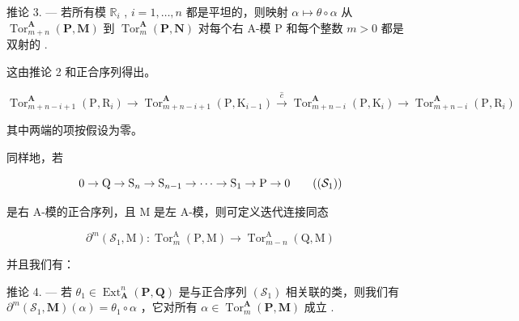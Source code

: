 推论 3. --- 若所有模 \(\mathbb{R}_i\) , \(i = 1, \ldots, n\) 都是平坦的，则映射 \(\alpha \mapsto \theta \circ \alpha\) 从 \(\operatorname{Tor}_{m+n}^{\mathbf{A}}(\mathbf{P}, \mathbf{M})\) 到 \(\operatorname{Tor}_m^{\mathbf{A}}(\mathbf{P}, \mathbf{N})\) 对每个右 A-模 P 和每个整数 \(m > 0\) 都是双射的 .

这由推论 2 和正合序列得出。

\[
\operatorname{Tor} _ {m + n - i + 1} ^ {\mathbf {A}} \left(\mathrm{P}, \mathrm{R} _ {i}\right)\rightarrow \operatorname{Tor} _ {m + n - i + 1} ^ {\mathbf {A}} \left(\mathrm{P}, \mathrm{K} _ {i - 1}\right) \xrightarrow {\hat {c}} \operatorname{Tor} _ {m + n - i} ^ {\mathbf {A}} \left(\mathrm{P}, \mathrm{K} _ {i}\right)\rightarrow \operatorname{Tor} _ {m + n - i} ^ {\mathbf {A}} \left(\mathrm{P}, \mathrm{R} _ {i}\right)
\]

其中两端的项按假设为零。

同样地，若

\[
0 \rightarrow \mathrm{Q} \rightarrow \mathrm{S} _ {n} \rightarrow \mathrm{S} _ {n - 1} \rightarrow \dots \rightarrow \mathrm{S} _ {1} \rightarrow \mathrm{P} \rightarrow 0\tag{$(\mathcal{S}_1)$}
\]

是右 A-模的正合序列，且 M 是左 A-模，则可定义迭代连接同态

\[
\partial^ {m} (\mathcal {S} _ {1}, \mathrm{M}): \operatorname{Tor} _ {m} ^ {\mathrm{A}} (\mathrm{P}, \mathrm{M}) \rightarrow \operatorname{Tor} _ {m - n} ^ {\mathrm{A}} (\mathrm{Q}, \mathrm{M})
\]

并且我们有：

推论 4. --- 若 \(\theta_{1} \in \operatorname{Ext}_{\mathbf{A}}^{n}(\mathbf{P}, \mathbf{Q})\) 是与正合序列 \((\mathcal{S}_{1})\) 相关联的类，则我们有 \(\partial^{m}(\mathcal{S}_{1}, \mathbf{M})(\alpha) = \theta_{1} \circ \alpha\) ，它对所有 \(\alpha \in \operatorname{Tor}_{m}^{\mathbf{A}}(\mathbf{P}, \mathbf{M})\) 成立 .

